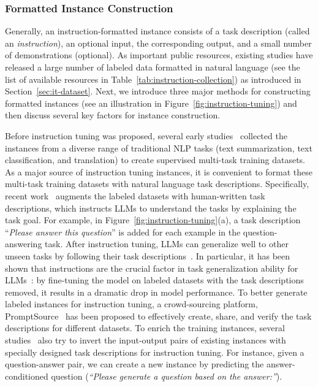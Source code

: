 \subsubsection{Formatted Instance Construction}\label{sec-instruction-formatted} 
Generally, an instruction-formatted instance consists of a task description (called an \emph{instruction}), an optional input, the corresponding output, and a small number of demonstrations (optional).
As important public resources, existing studies have released a large number of labeled data formatted in natural language (see the list of available resources in Table~\ref{tab:instruction-collection}) as introduced in Section~\ref{sec:it-dataset}. 
Next, we introduce three major methods for constructing formatted instances (see an illustration in Figure~\ref{fig:instruction-tuning}) and then discuss several key factors for instance construction.  



Before instruction tuning was proposed, several early  studies~\cite{Liu-ACL-2019-Multi,Aghajanyan-EMNLP-2021-Muppet,Tang-arxiv-2022-MVP} collected the instances from a diverse range of traditional NLP tasks (\eg text summarization, text classification, and translation) to create supervised multi-task training datasets. 
As a major source of instruction tuning instances, it is convenient to format these multi-task training  datasets with natural language task descriptions. 
Specifically, recent work~\cite{Wei-ICLR-2022-Finetuned,Sanh-ICLR-2022-Multitask,Ouyang-arxiv-2022-Training,Wang-EMNLP-2022-Super}  augments the labeled datasets with human-written task descriptions, which instructs LLMs to understand the tasks by explaining the task goal.  %
For example, in Figure~\ref{fig:instruction-tuning}(a),  a task description ``\emph{Please answer this question}'' is added for each example in the question-answering task. 
After instruction tuning, LLMs can generalize well to other unseen tasks by following their task descriptions~\cite{Wei-ICLR-2022-Finetuned,Sanh-ICLR-2022-Multitask,Chung-arxiv-2022-Scaling}. 
In particular, it has been shown that instructions are the crucial factor in task generalization ability for LLMs~\cite{Wei-ICLR-2022-Finetuned}:  
by fine-tuning the model on labeled datasets with the task descriptions removed, it results in a dramatic drop in model performance.
To better generate labeled instances for instruction tuning, a crowd-sourcing platform, PromptSource~\cite{Bach-ACL-2022-PromptSource} has been proposed to effectively create, share, and verify the task descriptions for different datasets.  
To enrich the training instances, several studies~\cite{Sanh-ICLR-2022-Multitask,Tang-arxiv-2022-MVP,Longpre-arxiv-2023-The} also try to invert the input-output pairs of existing instances with specially designed task descriptions for instruction tuning. For instance, given a question-answer pair, we can create a new instance by predicting the answer-conditioned question (\eg \emph{``Please generate a question based on the answer:''}). %

